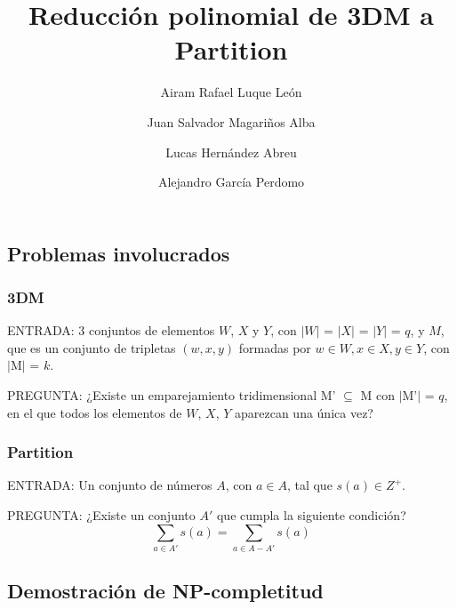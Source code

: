 \documentclass[11pt, a4paper, oneside]{memoir}
\title{\Huge Reducción polinomial de 3DM a Partition}
\author{Airam Rafael Luque León \and
Juan Salvador Magariños Alba \and
Lucas Hernández Abreu \and
Alejandro García Perdomo
}
\begin{document}
\maketitle

\chapter{}

\section{Problemas involucrados}

\subsection*{3DM}

\noindent ENTRADA: 3 conjuntos de elementos $W$, $X$ y $Y$, con  $|W|$ = $|X|$ = $|Y|$ = $q$, y $M$, que es un conjunto de tripletas $(w,x,y)$ formadas por \(w \in W, x \in X,y \in Y\), con $\mid$M$\mid$ = $k$. 

\noindent PREGUNTA: ¿Existe un emparejamiento tridimensional M' $\subseteq$ M con $\mid$M'$\mid$ = $q$, en el que todos los elementos de $W$, $X$, $Y$ aparezcan una única vez? 
\subsection*{Partition}

\noindent ENTRADA: Un conjunto de números $A$, con \(a \in A\), tal que \(s(a)\in Z^{+}\).

\noindent PREGUNTA: ¿Existe un conjunto $A'$ que cumpla la siguiente condición? \[ \sum_{a\in A'}s(a)= \sum_{a\in A - A'}s(a)\] 


\section{Demostración de NP-completitud}

\vspace{0.5cm}
\end{document}
